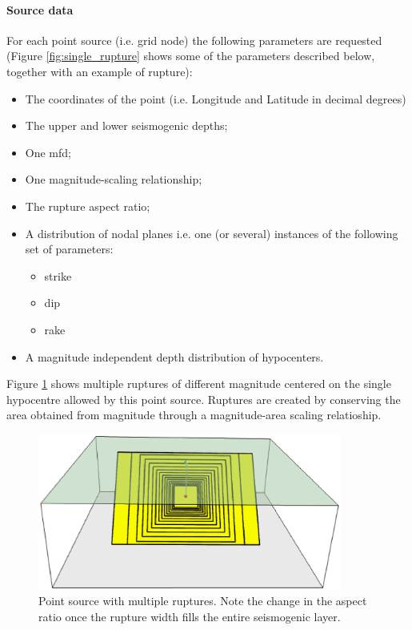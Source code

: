 \paragraph{Source data}
%
For each point source (i.e. grid node) the following parameters are requested
(Figure \ref{fig:single_rupture} shows some of the parameters described below, 
together with an example of rupture):
\begin{itemize}
\item The coordinates of the point (i.e. Longitude and Latitude in decimal 
    degrees)
\item The upper and lower seismogenic depths;
\item One \gls{mfd};
\item One magnitude-scaling relationship;
\item The rupture aspect ratio;
\item A distribution of nodal planes i.e. one (or several) instances 
    of the following set of parameters:
\begin{itemize}
    \item \gls{strike}
    \item \gls{dip}
    \item \gls{rake}
\end{itemize}
\item A magnitude independent depth distribution of hypocenters. 
\end{itemize}
%
Figure \ref{fig:point_source_multiple_ruptures} shows multiple ruptures 
of different magnitude centered on the single hypocentre allowed 
by this point source. Ruptures are created by conserving the area obtained
from magnitude through a magnitude-area scaling relatioship.
\begin{figure}[ht!]
\centering
\includegraphics[width=10cm]{./figures/hazard/point_source_multiple_ruptures.ps}
\caption{Point source with multiple ruptures. Note the change in the aspect 
ratio once the rupture width fills the entire seismogenic layer.}
\label{fig:point_source_multiple_ruptures}
\end{figure}
